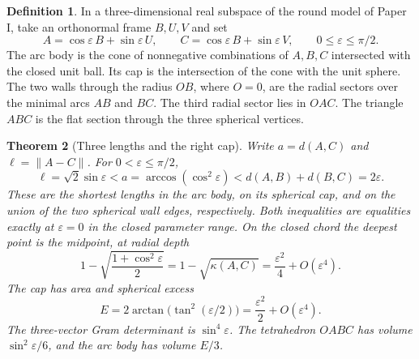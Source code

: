\documentclass[11pt,reqno]{amsart}
\newtheorem{theorem}{Theorem}[section]
\theoremstyle{definition}
\newtheorem{definition}[theorem]{Definition}
\theoremstyle{remark}
\numberwithin{equation}{section}
\begin{document}
\begin{definition}\label{m5:body}
In a three-dimensional real subspace of the round model of Paper I, take an
orthonormal frame \(B,U,V\) and set
\[
 A=\cos\varepsilon\,B+\sin\varepsilon\,U,\qquad
 C=\cos\varepsilon\,B+\sin\varepsilon\,V,\qquad
 0\leq\varepsilon\leq\pi/2.
\]
The arc body is the cone of nonnegative combinations of \(A,B,C\) intersected
with the closed unit ball. Its cap is the intersection of the cone with the
unit sphere. The two walls through the radius \(OB\), where \(O=0\), are the
radial sectors over the minimal arcs \(AB\) and \(BC\). The third radial
sector lies in \(OAC\). The triangle \(ABC\) is the flat section through the
three spherical vertices.
\end{definition}

\begin{theorem}[Three lengths and the right cap]\label{m5:ladder}
Write \(a=d(A,C)\) and \(\ell=\lVert A-C\rVert\). For
\(0<\varepsilon\leq\pi/2\),
\begin{equation}\label{m5:three}
 \ell=\sqrt{2}\sin\varepsilon
 < a=\arccos(\cos^2\varepsilon)
 < d(A,B)+d(B,C)=2\varepsilon .
\end{equation}
These are the shortest lengths in the arc body, on its spherical cap, and on
the union of the two \emph{spherical wall edges}, respectively. Both
inequalities are equalities exactly at \(\varepsilon=0\) in the closed
parameter range. On the closed chord the deepest point is the midpoint, at
radial depth
\begin{equation}\label{m5:depth}
 1-\sqrt{\frac{1+\cos^2\varepsilon}{2}}
 =1-\sqrt{\kappa(A,C)}
 =\frac{\varepsilon^2}{4}+O(\varepsilon^4).
\end{equation}
The cap has area and spherical excess
\begin{equation}\label{m5:excess}
 E=2\arctan\!\bigl(\tan^2(\varepsilon/2)\bigr)
   =\frac{\varepsilon^2}{2}+O(\varepsilon^4).
\end{equation}
The three-vector Gram determinant is \(\sin^4\varepsilon\). The tetrahedron
\(OABC\) has volume \(\sin^2\varepsilon/6\), and the arc body has volume \(E/3\).
\end{theorem}
\end{document}
